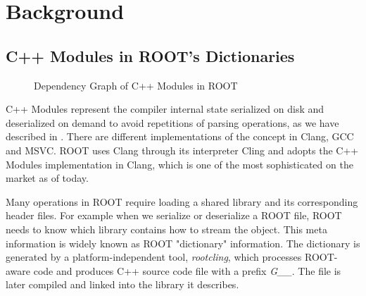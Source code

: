 \documentclass[12pt]{iopart}
\begin{document}
\section{Background}

\subsection{C++ Modules in ROOT's Dictionaries}
\label{intro}


\begin{figure}[!h]
  \centering
  \caption{Dependency Graph of C++ Modules in ROOT}
  \label{fig:pchandpcm}
\end{figure}

C++ Modules represent the compiler internal state serialized on disk and deserialized on demand to avoid repetitions of parsing operations, as we have described in \cite{chep-modules}. There are different implementations of the concept in Clang, GCC and MSVC. ROOT uses Clang through its interpreter Cling and adopts the C++ Modules implementation in Clang, which is one of the most sophisticated on the market as of today.

Many operations in ROOT require loading a shared library and its corresponding header files. For example when we serialize or deserialize a ROOT file, ROOT needs to know which library contains how to stream the object. This meta information is widely known as ROOT "dictionary" information. The dictionary is generated by a platform-independent tool, \textit{rootcling}, which processes ROOT-aware code and produces C++ source code file with a prefix \textit{G\_\_}. The file is later compiled and linked into the library it describes.
\end{document}
